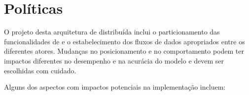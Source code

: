 \section{Políticas}\label{sec:polices}

O projeto desta arquitetura de \nd distribuída inclui o particionamento das
funcionalidades de \minas e o estabelecimento dos fluxos de dados apropriados
entre os diferentes atores.
Mudanças no posicionamento e no comportamento podem ter impactos diferentes no desempenho e na acurácia do modelo %
e devem ser escolhidas com cuidado.

Alguns dos aspectos com impactos potenciais na implementação incluem:

